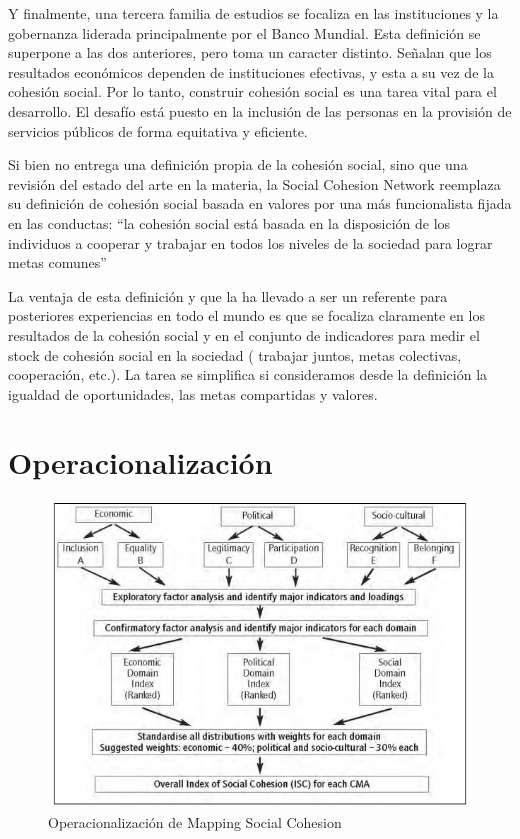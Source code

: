 \documentclass[
  12pt,
]{book}
\begin{document}
Y finalmente, una tercera familia de estudios se focaliza en las
instituciones y la gobernanza liderada principalmente por el Banco
Mundial. Esta definición se superpone a las dos anteriores, pero toma un
caracter distinto. Señalan que los resultados económicos dependen de
instituciones efectivas, y esta a su vez de la cohesión social. Por lo
tanto, construir cohesión social es una tarea vital para el desarrollo.
El desafío está puesto en la inclusión de las personas en la provisión
de servicios públicos de forma equitativa y eficiente.

Si bien \citet{jenson2010defining} no entrega una definición propia de la
cohesión social, sino que una revisión del estado del arte en la
materia, la Social Cohesion Network reemplaza su definición de cohesión
social basada en valores por una más funcionalista fijada en las
conductas: ``la cohesión social está basada en la disposición de los
individuos a cooperar y trabajar en todos los niveles de la sociedad
para lograr metas comunes'' \citep{Jeannote2003}

La ventaja de esta definición y que la ha llevado a ser un referente
para posteriores experiencias en todo el mundo es que se focaliza
claramente en los resultados de la cohesión social y en el conjunto de
indicadores para medir el stock de cohesión social en la sociedad (
trabajar juntos, metas colectivas, cooperación, etc.). La tarea se
simplifica si consideramos desde la definición la igualdad de
oportunidades, las metas compartidas y valores.

\hypertarget{operacionalizaciuxf3n}{%
\section{Operacionalización}\label{operacionalizaciuxf3n}}

\begin{figure}
\centering
\includegraphics{inputs/images/mapping.jpg}
\caption{Operacionalización de Mapping Social
Cohesion}
\end{figure}
\end{document}

